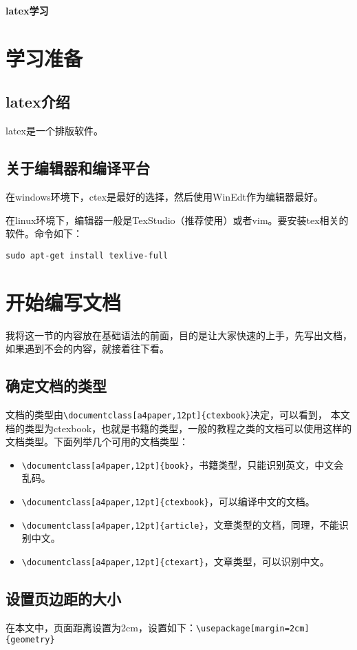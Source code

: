 \documentclass[a4paper,12pt]{ctexbook}
\begin{document}
	
\begin{center}
\huge \textbf{latex学习}
\end{center}

\tableofcontents

\begin{flushleft}

\chapter{学习准备}
\section{latex介绍}
latex是一个排版软件。
\section{关于编辑器和编译平台}
在windows环境下，ctex是最好的选择，然后使用WinEdt作为编辑器最好。

在linux环境下，编辑器一般是TexStudio（推荐使用）或者vim。要安装tex相关的软件。命令如下：
\begin{verbatim}
sudo apt-get install texlive-full
\end{verbatim}


\chapter{开始编写文档}
我将这一节的内容放在基础语法的前面，目的是让大家快速的上手，先写出文档，如果遇到不会的内容，就接着往下看。
\section{确定文档的类型}
文档的类型由\verb|\documentclass[a4paper,12pt]{ctexbook}|决定，可以看到，
本文档的类型为ctexbook，也就是书籍的类型，一般的教程之类的文档可以使用这样的文档类型。下面列举几个可用的文档类型：
\begin{itemize}
	\item \verb|\documentclass[a4paper,12pt]{book}|，书籍类型，只能识别英文，中文会乱码。
	\item \verb|\documentclass[a4paper,12pt]{ctexbook}|，可以编译中文的文档。
	\item \verb|\documentclass[a4paper,12pt]{article}|，文章类型的文档，同理，不能识别中文。
	\item \verb|\documentclass[a4paper,12pt]{ctexart}|，文章类型，可以识别中文。
\end{itemize}

\section{设置页边距的大小}
在本文中，页面距离设置为2cm，设置如下：\verb|\usepackage[margin=2cm]{geometry}|


\end{flushleft}
\end{document}
